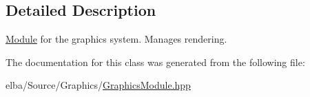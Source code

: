 \subsection{Detailed Description}
\mbox{\hyperlink{class_e_l_b_a_1_1_module}{Module}} for the graphics system. Manages rendering. 

The documentation for this class was generated from the following file\+:\begin{DoxyCompactItemize}
\item 
elba/\+Source/\+Graphics/\mbox{\hyperlink{_graphics_module_8hpp}{Graphics\+Module.\+hpp}}\end{DoxyCompactItemize}
